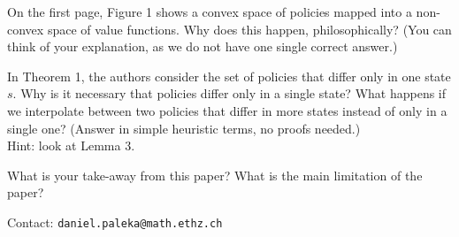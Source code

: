 \begin{questions}
\question[5]
On the first page, Figure 1 shows a convex space of policies mapped into a non-convex space of value functions.
Why does this happen, philosophically? (You can think of your explanation, as we do not have one single correct answer.)


\question[5]
In Theorem 1, the authors consider the set of policies that differ only in one state $s$. Why is it necessary that policies differ only in a single state?
What happens if we interpolate between two policies that differ in more states instead of only in a single one? (Answer in simple heuristic terms, no proofs needed.)\\

Hint: look at Lemma 3.

\question[10] 
What is your take-away from this paper? What is the main limitation of the paper? 
\end{questions}

Contact: \texttt{daniel.paleka@math.ethz.ch}


